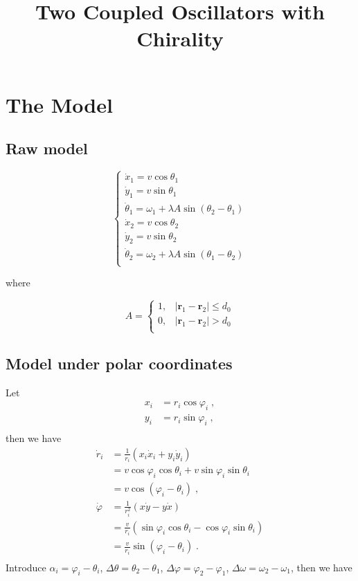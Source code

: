 \documentclass{article}
\title{\textbf{Two Coupled Oscillators with Chirality}}
\begin{document}
\maketitle

\section{The Model}

\subsection{Raw model}

$$
\begin{cases}
	\dot{x}_1=v\cos \theta _1\\
	\dot{y}_1=v\sin \theta _1\\
	\dot{\theta}_1=\omega _1+\lambda A\sin \left( \theta _2-\theta _1 \right)\\
	\dot{x}_2=v\cos \theta _2\\
	\dot{y}_2=v\sin \theta _2\\
	\dot{\theta}_2=\omega _2+\lambda A\sin \left( \theta _1-\theta _2 \right)\\
\end{cases}
$$

where 

$$
A=\begin{cases}
	1,&		\left| \mathbf{r}_1-\mathbf{r}_2 \right|\leqslant d_0\\
	0,&		\left| \mathbf{r}_1-\mathbf{r}_2 \right|>d_0\\
\end{cases}
$$

\subsection{Model under polar coordinates}

Let
$$
\begin{aligned}
	x_i&=r_i\cos \varphi _i\;,\\
	y_i&=r_i\sin \varphi _i\;,\\
\end{aligned}
$$
then we have
$$
\begin{aligned}
	\dot{r}_i&=\frac{1}{r_i}\left( x_i\dot{x}_i+y_i\dot{y}_i \right)\\
	&=v\cos \varphi _i\cos \theta _i+v\sin \varphi _i\sin \theta _i\\
	&=v\cos \left( \varphi _i-\theta _i \right)\;,\\
	\dot{\varphi}&=\frac{1}{r_{i}^{2}}\left( x\dot{y}-y\dot{x} \right)\\
	&=\frac{v}{r_i}\left( \sin \varphi _i\cos \theta _i-\cos \varphi _i\sin \theta _i \right)\\
	&=\frac{v}{r_i}\sin \left( \varphi _i-\theta _i \right)\;.\\
\end{aligned}
$$
Introduce $\alpha_i=\varphi_i-\theta_i$, $\Delta \theta =\theta _2-\theta _1$, $\Delta \varphi =\varphi _2-\varphi _1$, $\Delta \omega =\omega _2-\omega _1$, then we have
\end{document}
